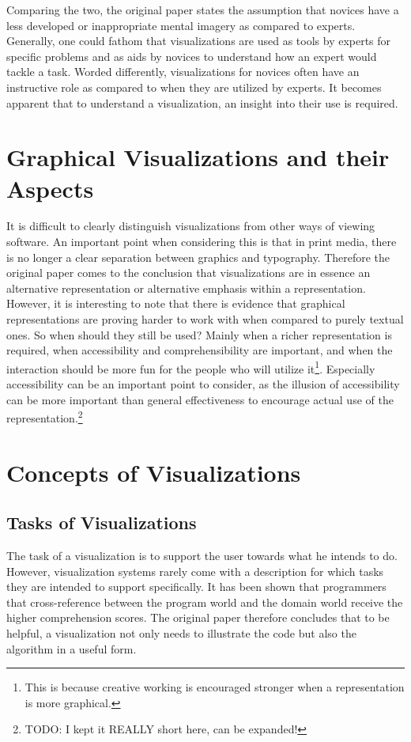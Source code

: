 \documentclass[11pt, a4paper, ngerman, twoside]{article}
\theoremstyle{plain}\newtheorem{Lemma}{Lemma}
\theoremstyle{plain}\newtheorem{Satz}[Lemma]{Satz}
\theoremstyle{definition}\newtheorem{Definition}[Lemma]{Definition}
\theoremstyle{definition}\newtheorem*{Beispiel}{Beispiel}
\theoremstyle{remark}\newtheorem*{Bemerkung}{Bemerkung}
\begin{document}
Comparing the two, the original paper states the assumption that novices have a less developed or inappropriate mental imagery as compared to experts. Generally, one could fathom that visualizations are used as tools by experts for specific problems and as aids by novices to understand how an expert would tackle a task. Worded differently, visualizations for novices often have an instructive role as compared to when they are utilized by experts. It becomes apparent that to understand a visualization, an insight into their use is required.

\section{Graphical Visualizations and their Aspects}

It is difficult to clearly distinguish visualizations from other ways of viewing software. An important point when considering this is that in print media, there is no longer a clear separation between graphics and typography. Therefore the original paper comes to the conclusion that visualizations are in essence an alternative representation or alternative emphasis within a representation. However, it is interesting to note that there is evidence that graphical representations are proving harder to work with when compared to purely textual ones. So when should they still be used? Mainly when a richer representation is required, when accessibility and comprehensibility are important, and when the interaction should be more fun for the people who will utilize it\footnote{This is because creative working is encouraged stronger when a representation is more graphical.}. Especially accessibility can be an important point to consider, as the illusion of accessibility can be more important than general effectiveness to encourage actual use of the representation.\footnote{TODO: I kept it REALLY short here, can be expanded!}

\section{Concepts of Visualizations}

\subsection{Tasks of Visualizations}

The task of a visualization is to support the user towards what he intends to do. However, visualization systems rarely come with a description for which tasks they are intended to support specifically. It has been shown that programmers that cross-reference between the program world and the domain world receive the higher comprehension scores\cite{penn}. The original paper therefore concludes that to be helpful, a visualization not only needs to illustrate the code but also the algorithm in a useful form.
\end{document}
